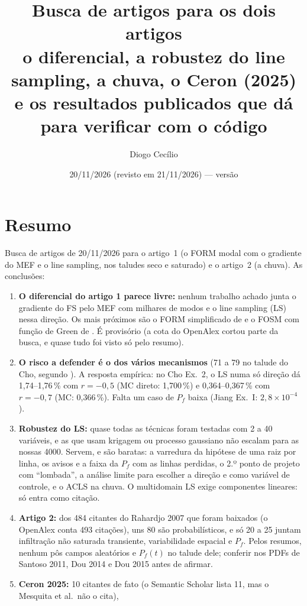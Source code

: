 \documentclass[11pt,a4paper]{article}
\title{Busca de artigos para os dois artigos\\[3pt]
\large o diferencial, a robustez do line sampling, a chuva, o Ceron (2025)\\ e os resultados publicados que dá para
verificar com o código}
\author{Diogo Cecílio}
\date{20/11/2026 (revisto em 21/11/2026) --- versão \versao}
\newcommand{\sci}[2]{\ensuremath{#1\times10^{#2}}}
\begin{document}
\maketitle
\tableofcontents

\section{Resumo}\label{sec:resumo}
Busca de artigos de 20/11/2026 para o artigo~1 (o FORM modal com o gradiente do MEF e o line sampling, nos taludes seco
e saturado) e o artigo~2 (a chuva). As conclusões:
\begin{enumerate}
  \item \textbf{O diferencial do artigo 1 parece livre:} nenhum trabalho achado junta o gradiente do FS pelo MEF com
    milhares de modos e o line sampling (LS) nessa direção. Os mais próximos são o FORM simplificado de \citet{ji2018}
    e o FOSM com função de Green de \citet{mesquita2025}. É provisório (a cota do OpenAlex cortou parte da busca, e
    quase tudo foi visto só pelo resumo).
  \item \textbf{O risco a defender é o dos vários mecanismos} (71 a 79 no talude do Cho, segundo \citealp{jiang2015}).
    A resposta empírica: no Cho Ex.~2, o LS numa só direção dá 1,74--1,76\,\% com $r = -0{,}5$ (MC direto:
    1,700\,\%) e 0,364--0,367\,\% com $r = -0{,}7$ (MC: 0,366\,\%). Falta um caso de $P_f$ baixa (Jiang Ex.~I:
    \sci{2{,}8}{-4}).
  \item \textbf{Robustez do LS:} quase todas as técnicas foram testadas com 2 a 40 variáveis, e as que usam krigagem ou
    processo gaussiano não escalam para as nossas 4000. Servem, e são baratas: a varredura da hipótese de uma raiz por
    linha, os avisos e a faixa da $P_f$ com as linhas perdidas, o 2.º ponto de projeto com ``lombada'', a análise
    limite para escolher a direção e como variável de controle, e o ACLS na chuva. O multidomain LS exige componentes
    lineares: só entra como citação.
  \item \textbf{Artigo 2:} dos 484 citantes do Rahardjo 2007 que foram baixados (o OpenAlex conta 493 citações), uns 80
    são probabilísticos, e só 20 a 25 juntam
    infiltração não saturada transiente, variabilidade espacial e $P_f$. Pelos resumos, nenhum pôs campos aleatórios e
    $P_f(t)$ no talude dele; conferir nos PDFs de Santoso 2011, Dou 2014 e Dou 2015 antes de afirmar.
  \item \textbf{Ceron 2025:} 10 citantes de fato (o Semantic Scholar lista 11, mas o Mesquita et al.\ não o cita),

\end{enumerate}
\end{document}
